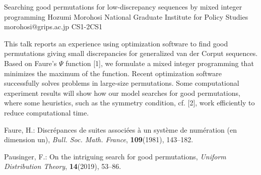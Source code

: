 \begin{talk}
  {Searching good permutations for low-discrepancy sequences by mixed integer programming}%
  {Hozumi Morohosi}%
  {National Graduate Institute for Policy Studies}%
  {morohosi@grips.ac.jp}%
  {}%
{}{}{CS1-2}{CS1}

\medskip

This talk reports an experience using optimization software to find good permutations giving small discrepancies for generalized van der Corput sequences.
Based on Faure's $\Psi$ function [1], we formulate a mixed integer programming
that minimizes the maximum of the function.
Recent optimization software successfully solves problems in large-size permutations.
Some computational experiment results will show how our model searches for good permutations,
where some heuristics, such as the symmetry condition, cf. [2], work efficiently to reduce computational time.



\noindent
[1] Faure, H.: Discr\'epances de suites associ\'ees \`a un syst\`eme de num\'eration (en dimension un), {\em Bull. Soc. Math. France}, {\bf 109}(1981), 143--182.

\noindent
[2] Pausinger, F.: On the intriguing search for good permutations, {\em Uniform Distribution Theory}, {\bf 14}(2019), 53--86.
\end{talk}

